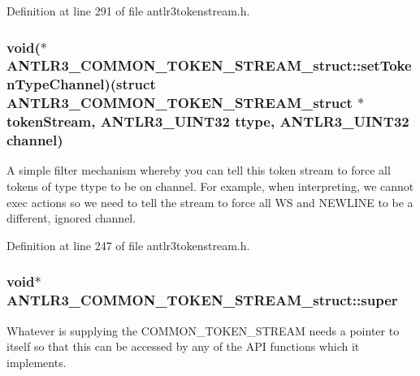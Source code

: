 Definition at line 291 of file antlr3tokenstream.\-h.

\hypertarget{struct_a_n_t_l_r3___c_o_m_m_o_n___t_o_k_e_n___s_t_r_e_a_m__struct_a542cb45a42cb59120d49630f42a3d030}{
\subsubsection[{set\-Token\-Type\-Channel}]{\setlength{\rightskip}{0pt plus 5cm}void($\ast$ A\-N\-T\-L\-R3\-\_\-\-C\-O\-M\-M\-O\-N\-\_\-\-T\-O\-K\-E\-N\-\_\-\-S\-T\-R\-E\-A\-M\-\_\-struct\-::set\-Token\-Type\-Channel)(struct {\bf A\-N\-T\-L\-R3\-\_\-\-C\-O\-M\-M\-O\-N\-\_\-\-T\-O\-K\-E\-N\-\_\-\-S\-T\-R\-E\-A\-M\-\_\-struct} $\ast$token\-Stream, {\bf A\-N\-T\-L\-R3\-\_\-\-U\-I\-N\-T32} ttype, {\bf A\-N\-T\-L\-R3\-\_\-\-U\-I\-N\-T32} {\bf channel})}}\label{struct_a_n_t_l_r3___c_o_m_m_o_n___t_o_k_e_n___s_t_r_e_a_m__struct_a542cb45a42cb59120d49630f42a3d030}
A simple filter mechanism whereby you can tell this token stream to force all tokens of type ttype to be on channel. For example, when interpreting, we cannot exec actions so we need to tell the stream to force all W\-S and N\-E\-W\-L\-I\-N\-E to be a different, ignored channel. 

Definition at line 247 of file antlr3tokenstream.\-h.

\hypertarget{struct_a_n_t_l_r3___c_o_m_m_o_n___t_o_k_e_n___s_t_r_e_a_m__struct_ae313a96c7edf6e543f6c6c8cda1568cf}{
\subsubsection[{super}]{\setlength{\rightskip}{0pt plus 5cm}void$\ast$ A\-N\-T\-L\-R3\-\_\-\-C\-O\-M\-M\-O\-N\-\_\-\-T\-O\-K\-E\-N\-\_\-\-S\-T\-R\-E\-A\-M\-\_\-struct\-::super}}\label{struct_a_n_t_l_r3___c_o_m_m_o_n___t_o_k_e_n___s_t_r_e_a_m__struct_ae313a96c7edf6e543f6c6c8cda1568cf}
Whatever is supplying the C\-O\-M\-M\-O\-N\-\_\-\-T\-O\-K\-E\-N\-\_\-\-S\-T\-R\-E\-A\-M needs a pointer to itself so that this can be accessed by any of the A\-P\-I functions which it implements. 

